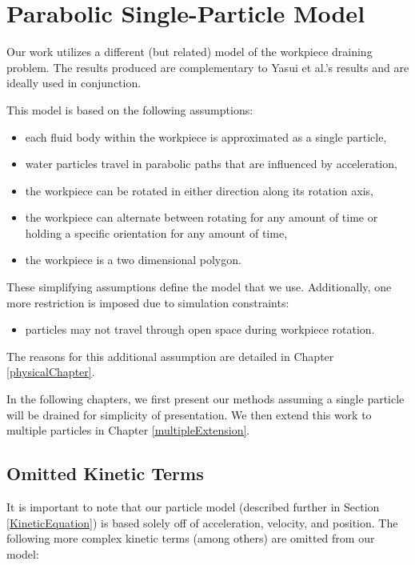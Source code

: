 \section{Parabolic Single-Particle Model}\label{parabSingleParticle}

Our work utilizes a different (but related) model of the workpiece draining problem. The results produced are complementary to Yasui et al.'s results and are ideally used in conjunction.

This model is based on the following assumptions:

\begin{itemize}
	\item each fluid body within the workpiece is approximated as a single particle,
	\item water particles travel in parabolic paths that are influenced by acceleration,
	\item the workpiece can be rotated in either direction along its rotation axis,
	\item the workpiece can alternate between rotating for any amount of time or holding a specific orientation for any amount of time,
	\item the workpiece is a two dimensional polygon.
\end{itemize}

These simplifying assumptions define the model that we use. Additionally, one more restriction is imposed due to simulation constraints:

\begin{itemize}
	\item particles may not travel through open space during workpiece rotation.
\end{itemize}

The reasons for this additional assumption are detailed in Chapter \ref{physicalChapter}.

In the following chapters, we first present our methods assuming a single particle will be drained for simplicity of presentation. We then extend this work to multiple particles in Chapter \ref{multipleExtension}.

	\subsection{Omitted Kinetic Terms}

It is important to note that our particle model (described further in Section \ref{KineticEquation}) is based solely off of acceleration, velocity, and position. The following more complex kinetic terms (among others) are omitted from our model:

